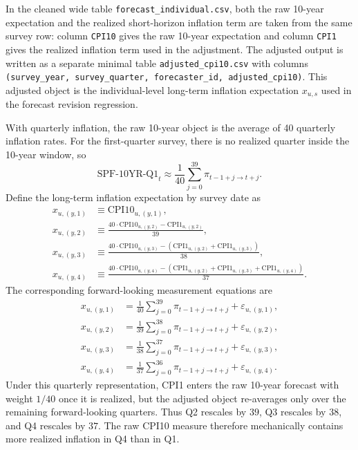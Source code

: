 \documentclass[11pt]{article}
\begin{document}
In the cleaned wide table \texttt{forecast\_individual.csv}, both the raw
10-year expectation and the realized short-horizon inflation term are taken from
the same survey row: column \texttt{CPI10} gives the raw 10-year expectation
and column \texttt{CPI1} gives the realized inflation term used in the
adjustment. The adjusted output is written as a separate minimal table
\texttt{adjusted\_cpi10.csv} with columns
\texttt{(survey\_year, survey\_quarter, forecaster\_id, adjusted\_cpi10)}. This
adjusted object is the individual-level long-term inflation expectation
$x_{u,s}$ used in the forecast revision regression.

With quarterly inflation, the raw 10-year object is the average of 40 quarterly
inflation rates. For the first-quarter survey, there is no realized quarter
inside the 10-year window, so
\begin{equation}
\text{SPF-10YR-Q1}_t
\approx \frac{1}{40}
\sum_{j=0}^{39} \pi_{t-1+j \to t+j}.
\end{equation}
Define the long-term inflation expectation by survey date as
\begin{align}
x_{u,(y,1)} &\equiv \text{CPI10}_{u,(y,1)}, \\
x_{u,(y,2)} &\equiv
 \frac{40\cdot\text{CPI10}_{u,(y,2)} - \text{CPI1}_{u,(y,2)}}{39}, \\
x_{u,(y,3)} &\equiv
 \frac{40\cdot\text{CPI10}_{u,(y,3)}
 - \left(\text{CPI1}_{u,(y,2)} + \text{CPI1}_{u,(y,3)}\right)}{38}, \\
x_{u,(y,4)} &\equiv
 \frac{40\cdot\text{CPI10}_{u,(y,4)}
 - \left(\text{CPI1}_{u,(y,2)} + \text{CPI1}_{u,(y,3)}
 + \text{CPI1}_{u,(y,4)}\right)}{37}.
\end{align}
The corresponding forward-looking measurement equations are
\begin{align}
x_{u,(y,1)} &= \frac{1}{40}\sum_{j=0}^{39} \pi_{t-1+j \to t+j}
 + \varepsilon_{u,(y,1)}, \\
x_{u,(y,2)} &= \frac{1}{39}\sum_{j=0}^{38} \pi_{t-1+j \to t+j}
 + \varepsilon_{u,(y,2)}, \\
x_{u,(y,3)} &= \frac{1}{38}\sum_{j=0}^{37} \pi_{t-1+j \to t+j}
 + \varepsilon_{u,(y,3)}, \\
x_{u,(y,4)} &= \frac{1}{37}\sum_{j=0}^{36} \pi_{t-1+j \to t+j}
 + \varepsilon_{u,(y,4)}.
\end{align}
Under this quarterly representation, CPI1 enters the raw 10-year forecast with
weight $1/40$ once it is realized, but the adjusted object re-averages only over
the remaining forward-looking quarters. Thus Q2 rescales by $39$, Q3 rescales by
$38$, and Q4 rescales by $37$. The raw CPI10 measure therefore mechanically
contains more realized inflation in Q4 than in Q1.
\end{document}
